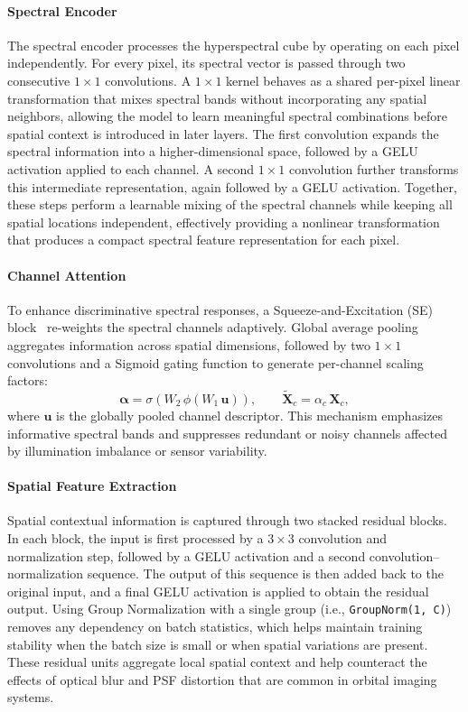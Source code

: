 \documentclass[12pt]{elsarticle}
\begin{document}
\paragraph{Spectral Encoder}

The spectral encoder processes the hyperspectral cube by operating on each pixel independently. For every pixel, its spectral vector is passed through two consecutive \(1\times1\) convolutions. 
A $1\times1$ kernel behaves as a shared per-pixel linear transformation that mixes spectral bands without incorporating any spatial neighbors, allowing the model to learn meaningful spectral combinations before spatial context is introduced in later layers.
The first convolution expands the spectral information into a higher-dimensional space, followed by a GELU activation applied to each channel. A second \(1\times1\) convolution further transforms this intermediate representation, again followed by a GELU activation. Together, these steps perform a learnable mixing of the spectral channels while keeping all spatial locations independent, effectively providing a nonlinear transformation that produces a compact spectral feature representation for each pixel.


\paragraph{Channel Attention}

To enhance discriminative spectral responses, a Squeeze-and-Excitation (SE) block~\cite{hu2018squeeze} re-weights the spectral channels adaptively. 
Global average pooling aggregates information across spatial dimensions, followed by two \(1\times1\) convolutions and a Sigmoid gating function to generate per-channel scaling factors:
\begin{equation}
\boldsymbol{\alpha} = \sigma(W_2\,\phi(W_1\,\mathbf{u})), 
\qquad 
\tilde{\mathbf{X}}_c = \alpha_c\,\mathbf{X}_c,
\end{equation}
where \(\mathbf{u}\) is the globally pooled channel descriptor. 
This mechanism emphasizes informative spectral bands and suppresses redundant or noisy channels affected by illumination imbalance or sensor variability.

\paragraph{Spatial Feature Extraction}

Spatial contextual information is captured through two stacked residual blocks. In each block, the input is first processed by a \(3\times3\) convolution and normalization step, followed by a GELU activation and a second convolution–normalization sequence. The output of this sequence is then added back to the original input, and a final GELU activation is applied to obtain the residual output. Using Group Normalization with a single group (i.e., \texttt{GroupNorm(1, C)}) removes any dependency on batch statistics, which helps maintain training stability when the batch size is small or when spatial variations are present. These residual units aggregate local spatial context and help counteract the effects of optical blur and PSF distortion that are common in orbital imaging systems.
\end{document}
